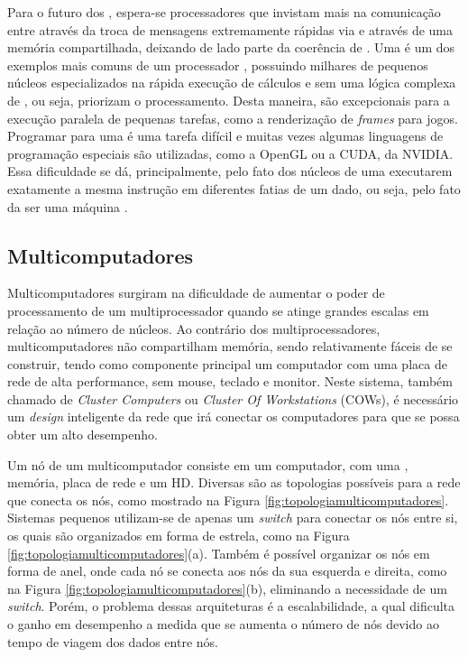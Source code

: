 Para o futuro dos \manycores, espera-se processadores que invistam mais  na comunicação entre \CPUs através da troca de mensagens extremamente rápidas via \hardware e através de uma memória compartilhada, deixando de lado parte da coerência de \cache. Uma \GPU é um dos exemplos mais comuns de um processador \manycore, possuindo milhares de pequenos núcleos especializados na rápida execução de cálculos e sem uma lógica complexa de \cache, ou seja, priorizam o processamento. Desta maneira, \GPUs são excepcionais para a execução paralela de pequenas tarefas, como a renderização de \textit{frames} para jogos. Programar para uma \GPU é uma tarefa difícil e muitas vezes algumas linguagens de programação especiais são utilizadas, como a OpenGL ou a CUDA, da NVIDIA. Essa dificuldade se dá, principalmente, pelo fato dos núcleos de uma \GPU executarem exatamente a mesma instrução em diferentes fatias de um dado, ou seja, pelo fato da \GPU ser uma máquina \textit{\SIMD}.

\subsection{Multicomputadores}
\label{sec:multicomputadores}

Multicomputadores surgiram na dificuldade de aumentar o poder de processamento de um multiprocessador quando se atinge grandes escalas em relação ao número de núcleos. Ao contrário dos multiprocessadores, multicomputadores não compartilham memória, sendo relativamente fáceis de se construir, tendo como componente principal um computador com uma placa de rede de alta performance, sem mouse, teclado e monitor. Neste sistema, também chamado de \textit{Cluster Computers} ou \textit{Cluster Of Workstations} (COWs), é necessário um \textit{design} inteligente da rede que irá conectar os computadores para que se possa obter um alto desempenho.

Um nó de um multicomputador consiste em um computador, com uma \CPU, memória, placa de rede e um HD. Diversas são as topologias possíveis para a rede que conecta os nós, como mostrado na Figura \ref{fig:topologiamulticomputadores}. Sistemas pequenos utilizam-se de apenas um \textit{switch} para conectar os nós entre si, os quais são organizados em forma de estrela, como na Figura \ref{fig:topologiamulticomputadores}(a). Também é possível organizar os nós em forma de anel, onde cada nó se conecta aos nós da sua esquerda e direita, como na Figura \ref{fig:topologiamulticomputadores}(b), eliminando a necessidade de um \textit{switch}. Porém, o problema dessas arquiteturas é a escalabilidade, a qual dificulta o ganho em desempenho a medida que se aumenta o número de nós devido ao tempo de viagem dos dados entre nós.

